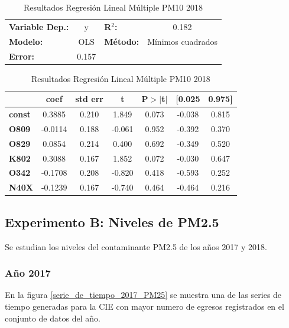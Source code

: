 \begin{table}[hbt!]
\caption{Resultados Regresión Lineal Múltiple PM10 2018}
\label{tab:RRLM PM10 2018}
\begin{center}
\begin{tabular}{lclc}
\toprule
\textbf{Variable Dep.:}    &        y         & \textbf{  R$^2$:         } &     0.182   \\
\textbf{Modelo:}            &       OLS        & \textbf{Método:}           &  Mínimos cuadrados  \\
\textbf{Error:}            & 0.157  \\
\bottomrule
\end{tabular}
\begin{tabular}{lcccccc}
               & \textbf{coef} & \textbf{std err} & \textbf{t} & \textbf{P$> |$t$|$} & \textbf{[0.025} & \textbf{0.975]}  \\
\midrule
\textbf{const} &       0.3885  &        0.210     &     1.849  &         0.073        &       -0.038    &        0.815     \\
\textbf{O809}  &      -0.0114  &        0.188     &    -0.061  &         0.952        &       -0.392    &        0.370     \\
\textbf{O829}  &       0.0854  &        0.214     &     0.400  &         0.692        &       -0.349    &        0.520     \\
\textbf{K802}  &       0.3088  &        0.167     &     1.852  &         0.072        &       -0.030    &        0.647     \\
\textbf{O342}  &      -0.1708  &        0.208     &    -0.820  &         0.418        &       -0.593    &        0.252     \\
\textbf{N40X}  &      -0.1239  &        0.167     &    -0.740  &         0.464        &       -0.464    &        0.216     \\
\bottomrule
\end{tabular}
\end{center}
\end{table}


\clearpage
\subsection{Experimento B: Niveles de PM2.5}
Se estudian los niveles del contaminante PM2.5 de los años 2017 y 2018.

\subsubsection{Año 2017}
En la figura \ref{serie_de_tiempo_2017_PM25} se muestra una de las series de tiempo generadas para la CIE \citep{r9} con mayor numero de egresos registrados en el conjunto de datos del año.

